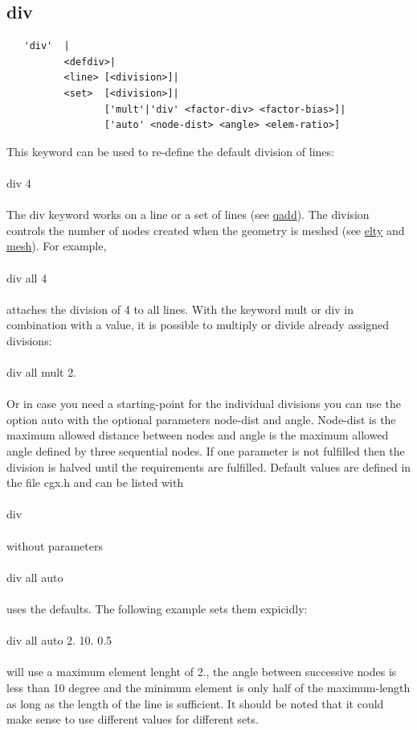 \documentclass{article}
\providecommand{\htmlref}[2]{\hyperref[#2]{#1}}
\begin{document}
\subsection{\label{div}div}
\begin{verbatim}
   'div'  |
          <defdiv>|
          <line> [<division>]|
          <set>  [<division>]|
                 ['mult'|'div' <factor-div> <factor-bias>]|
                 ['auto' <node-dist> <angle> <elem-ratio>] 
\end{verbatim}
This keyword can be used to re-define the default division of lines:\\\\div 4\\\\The div keyword works on a line or a set of lines (see \htmlref{qadd}{qadd}). The division controls the number of nodes created when the geometry is meshed (see \htmlref{elty}{elty} and \htmlref{mesh}{mesh}). For example,\\\\
div all 4\\\\attaches the division of 4 to all lines. With the keyword mult or div in combination with a value, it is possible to multiply or divide already assigned divisions:\\\\
div all mult 2.\\\\Or in case you need a starting-point for the individual divisions you can use the option auto with the optional parameters node-dist and angle. Node-dist is the maximum allowed distance between nodes and angle is the maximum allowed angle defined by three sequential nodes. If one parameter is not fulfilled then the division is halved until the requirements are fulfilled. Default values are defined in the file cgx.h and can be listed with\\\\div\\\\without parameters\\\\
div all auto\\\\uses the defaults. The following example sets them expicidly:\\\\div all auto 2. 10. 0.5\\\\will use a maximum element lenght of 2., the angle between successive nodes is less than 10 degree and the minimum element is only half of the maximum-length as long as the length of the line is sufficient. It should be noted that it could make sense to use different values for different sets.
  
\end{document}
